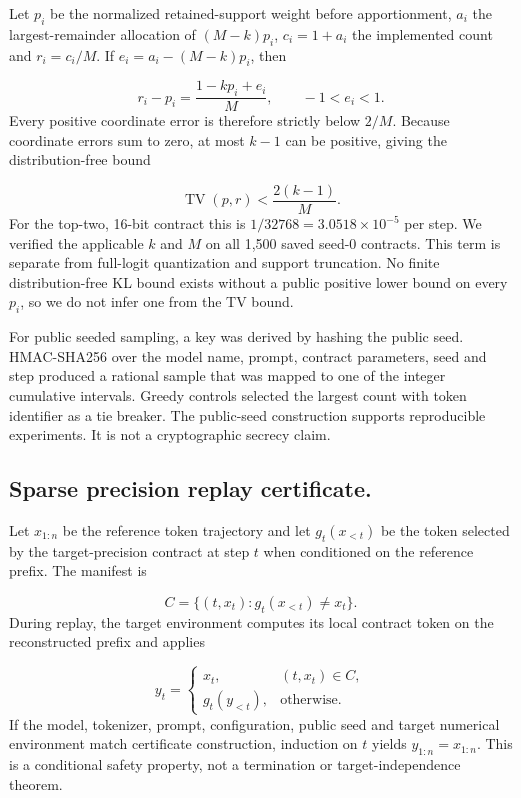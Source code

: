 \documentclass{nature}
\begin{document}
\begin{methods}
Let \(p_i\) be the normalized retained-support weight before apportionment, \(a_i\) the largest-remainder allocation of \((M-k)p_i\), \(c_i=1+a_i\) the implemented count and \(r_i=c_i/M\). If \(e_i=a_i-(M-k)p_i\), then

\[
r_i-p_i=\frac{1-kp_i+e_i}{M}, \qquad -1<e_i<1.
\]
Every positive coordinate error is therefore strictly below \(2/M\). Because coordinate errors sum to zero, at most \(k-1\) can be positive, giving the distribution-free bound

\[
\operatorname{TV}(p,r)<\frac{2(k-1)}{M}.
\]
For the top-two, 16-bit contract this is \(1/32768=3.0518\times10^{-5}\) per step. We verified the applicable \(k\) and \(M\) on all 1,500 saved seed-0 contracts. This term is separate from full-logit quantization and support truncation. No finite distribution-free KL bound exists without a public positive lower bound on every \(p_i\), so we do not infer one from the TV bound.

For public seeded sampling, a key was derived by hashing the public seed. HMAC-SHA256 over the model name, prompt, contract parameters, seed and step produced a rational sample that was mapped to one of the integer cumulative intervals. Greedy controls selected the largest count with token identifier as a tie breaker. The public-seed construction supports reproducible experiments. It is not a cryptographic secrecy claim.

\subsection{Sparse precision replay certificate.}
Let \(x_{1:n}\) be the reference token trajectory and let \(g_t(x_{<t})\) be the token selected by the target-precision contract at step \(t\) when conditioned on the reference prefix. The manifest is

\[
C=\{(t,x_t):g_t(x_{<t})\neq x_t\}.
\]
During replay, the target environment computes its local contract token on the reconstructed prefix and applies

\[
y_t=\begin{cases}
x_t, & (t,x_t)\in C,\\
g_t(y_{<t}), & \text{otherwise}.
\end{cases}
\]
If the model, tokenizer, prompt, configuration, public seed and target numerical environment match certificate construction, induction on \(t\) yields \(y_{1:n}=x_{1:n}\). This is a conditional safety property, not a termination or target-independence theorem.


\end{methods}
\end{document}
